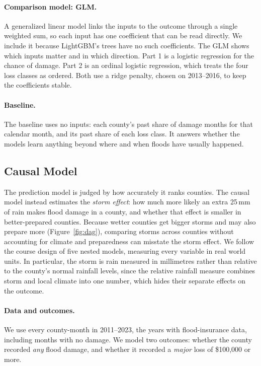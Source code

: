 \documentclass[10pt,twocolumn]{article}
\begin{document}
\paragraph{Comparison model: GLM.} A generalized linear model links the inputs to the outcome
through a single weighted sum, so each input has one coefficient that can be read directly.
We include it because LightGBM's trees have no such coefficients. The GLM shows which inputs
matter and in which direction. Part 1 is a logistic regression for the chance of damage. Part 2
is an ordinal logistic regression, which treats the four loss classes as ordered. Both use a
ridge penalty, chosen on 2013--2016, to keep the coefficients stable.

\paragraph{Baseline.} The baseline uses no inputs: each county's past share of damage months for
that calendar month, and its past share of each loss class. It answers whether the models
learn anything beyond where and when floods have usually happened.

\subsection{Causal Model}
\label{sec:causal}

The prediction model is judged by how accurately it ranks counties. The causal model instead estimates the \emph{storm effect}: how much more likely an extra 25\,mm of rain makes flood damage in a county, and whether that effect is smaller in better-prepared counties. Because wetter counties get bigger storms and
may also prepare more (Figure~\ref{fig:dag}), comparing storms across counties without accounting
for climate and preparedness can misstate the storm effect. We follow the course design of five
nested models, measuring every variable in real world units. In particular, the storm is
rain measured in millimetres rather than relative to the county's normal rainfall levels, since the relative rainfall measure combines
storm and local climate into one number, which hides their separate effects on the outcome.

\paragraph{Data and outcomes.} We use every county-month in 2011--2023, the years with
flood-insurance data, including months with no damage. We model two outcomes: whether the county
recorded \emph{any} flood damage, and whether it recorded a \emph{major} loss of \$100{,}000 or
more.
\end{document}
